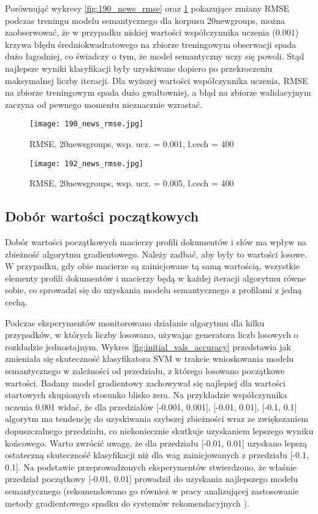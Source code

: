 \documentclass{pracamgr}
\begin{document}
Porównująć wykresy \ref{fig:190_news_rmse} oraz \ref{fig:192_news_rmse} pokazujące zmiany RMSE podczas treningu modelu semantycznego dla korpusu 20newgroups, można zaobserwować, że w przypadku niskiej wartości współczynnika uczenia (0.001) krzywa błędu średniokwadratowego na zbiorze treningowym obserwacji spada dużo łagodniej, co świadczy o tym, że model semantyczny uczy się powoli. Stąd najlepsze wyniki klasyfikacji były uzyskiwane dopiero po przekroczeniu maksymalnej liczby iteracji. Dla wyższej wartości współczynnika uczenia, RMSE na zbiorze treningowym spada dużo gwałtowniej, a błąd na zbiorze walidacyjnym zaczyna od pewnego momentu nieznacznie wzrastać.

\begin{figure}[]
  \texttt{[image: 190\_news\_rmse.jpg]}
  \caption{RMSE, 20newsgroups, wsp. ucz. = 0.001, l.cech = 400}\label{fig:190_news_rmse}
\endminipage\hfill
{}%
  \texttt{[image: 192\_news\_rmse.jpg]}
  \caption{RMSE, 20newsgroups, wsp. ucz. = 0.005, l.cech = 400}\label{fig:192_news_rmse}
\endminipage\hfill
\end{figure}

\subsection{Dobór wartości początkowych}

Dobór wartości początkowych macierzy profili dokumentów i słów ma wpływ na zbieżność algorytmu  gradientowego. Należy zadbać, aby były to wartości losowe. W przypadku, gdy obie macierze są zainicjowane tą samą wartością, wszystkie elementy profili dokumentów i macierzy będą w każdej iteracji algorytmu równe sobie, co sprowadzi się do uzyskania modelu semantycznego z profilami z jedną cechą. 

Podczas eksperymentów monitorowano działanie algorytmu dla kilku przypadków, w których liczby losowano, używając generatora liczb losowych o rozkładzie jednostajnym. Wykres \ref{fig:initial_vals_accuracy} przedstawia jak zmieniała się skuteczność klasyfikatora SVM w trakcie wnioskowania modelu semantycznego w zależności od przedziału, z którego losowano początkowe wartości. Badany model gradientowy zachowywał się najlepiej dla wartości startowych skupionych stosunko blisko zera. Na przykładzie współczynnika uczenia 0.001 widać, że dla przedziałów [-0.001, 0.001], [-0.01, 0.01], [-0.1, 0.1] algorytm ma tendencję do uzyskiwania szybszej zbieżności wraz ze zwiększaniem dopuszczalnego przedziału, co niekoniecznie skutkuje uzyskaniem lepszego wyniku końcowego. Warto zwrócić uwagę, że dla przedziału [-0.01, 0.01] uzyskano lepszą ostateczną skuteczność klasyfikacji niż dla wag zainicjowanych z przedziału [-0.1, 0.1]. Na podstawie przeprowadzonych eksperymentów stwierdzono, że właśnie przedział początkowy [-0.01, 0.01] prowadził do uzyskania najlepszego modelu semantycznego (rekomendowano go również w pracy analizującej zastosowanie metody gradientowego spadku do systemów rekomendacyjnych \cite{takacs}).
\end{document}

